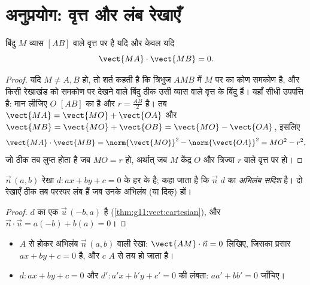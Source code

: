\section{अनुप्रयोग: वृत्त और लंब रेखाएँ}

\begin{proposition}[दिए हुए व्यास वाला वृत्त]\label{prop:g11:scal:diameter}
बिंदु $M$ व्यास $[AB]$ वाले वृत्त पर है यदि और केवल यदि
\[
\vect{MA} \cdot \vect{MB} = 0 .
\]
\end{proposition}

\begin{proof}
यदि $M \neq A, B$ हो, तो शर्त कहती है कि त्रिभुज $AMB$ में $M$ पर का कोण समकोण है,
और किसी रेखाखंड को समकोण पर देखने वाले बिंदु ठीक उसी व्यास वाले वृत्त के
बिंदु हैं। यहाँ सीधी उपपत्ति है: मान लीजिए $O$ $[AB]$ का  है और
$r = \frac{AB}{2}$ है। तब $\vect{MA} = \vect{MO} + \vect{OA}$ और $\vect{MB} = \vect{MO} + \vect{OB} = \vect{MO} - \vect{OA}$, इसलिए
\[
\vect{MA}\cdot\vect{MB}
= \norm{\vect{MO}}^2 - \norm{\vect{OA}}^2 = MO^2 - r^2,
\]
जो ठीक तब लुप्त होता है जब $MO = r$ हो, अर्थात् जब $M$ केंद्र $O$ और
त्रिज्या $r$ वाले वृत्त पर हो।
\end{proof}

\begin{proposition}[रेखा का अभिलंब सदिश]\label{prop:g11:scal:normal}
 $\vec n\,(a, b)$ रेखा $d : ax + by + c = 0$ के हर  के  है; कहा जाता है कि $\vec n$
$d$ का \emph{अभिलंब सदिश} है। दो रेखाएँ ठीक तब परस्पर
लंब हैं जब उनके अभिलंब (या दिक्)   हों।
\end{proposition}

\begin{proof}
$d$ का एक  $\vec u\,(-b, a)$ है (\cref{thm:g11:vect:cartesian}), और $\vec n \cdot \vec u = a(-b) + b(a) = 0$।
\end{proof}

\begin{method}[अभिलंब सदिशों का उपयोग]\label{met:g11:scal:normal}
\begin{itemize}
  \item $A$ से होकर अभिलंब $\vec n\,(a,b)$ वाली रेखा: $\vect{AM} \cdot \vec n = 0$ लिखिए, जिसका प्रसार
        $ax + by + c = 0$ है, और $c$ $A$ से तय हो जाता है।
  \item $d: ax+by+c = 0$ और $d': a'x+b'y+c' = 0$ की लंबता: $aa' + bb' = 0$ जाँचिए।
\end{itemize}
\end{method}

